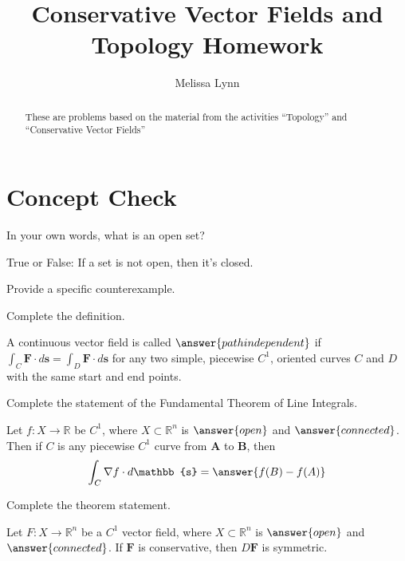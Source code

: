 \documentclass{ximera}
\title{Conservative Vector Fields and Topology Homework}
\author{Melissa Lynn}
\begin{document}
  
\begin{abstract}  
These are problems based on the material from the activities ``Topology'' and ``Conservative Vector Fields''
\end{abstract}  
\maketitle

\section{Concept Check}

\begin{problem}
In your own words, what is an open set?
\begin{freeResponse}
\end{freeResponse}
\end{problem}

\begin{problem}
True or False: If a set is not open, then it's closed.
\begin{multipleChoice}
\end{multipleChoice}
\begin{problem}
Provide a specific counterexample.
\begin{freeResponse}
\end{freeResponse}
\end{problem}
\end{problem}

\begin{problem}
Complete the definition.

A continuous vector field is called $\answer{path independent}$ if $\int_C\mathbf{F}\cdot d\mathbf{s} = \int_D\mathbf{F}\cdot d\mathbf{s}$ for any two simple, piecewise $C^1$, oriented curves $C$ and $D$ with the same start and end points.
\end{problem}

\begin{problem}
Complete the statement of the Fundamental Theorem of Line Integrals.

Let $f:X\rightarrow\mathbb{R}$ be $C^1$, where $X\subset\mathbb{R}^n$ is $\answer{open}$ and $\answer{connected}$. Then if $C$ is any piecewise $C^1$ curve from $\mathbf{A}$ to $\mathbf{B}$, then
\[
\int_C\nabla f\cdot d\mathbb{s} = \answer{f(B)-f(A)}
\]
\end{problem}

\begin{problem}
Complete the theorem statement.

Let $F:X\rightarrow\mathbb{R}^n$ be a $C^1$ vector field, where $X\subset\mathbb{R}^n$ is $\answer{open}$ and $\answer{connected}$. If $\mathbf{F}$ is conservative, then $D\mathbf{F}$ is symmetric.
\end{problem}
\end{document}
